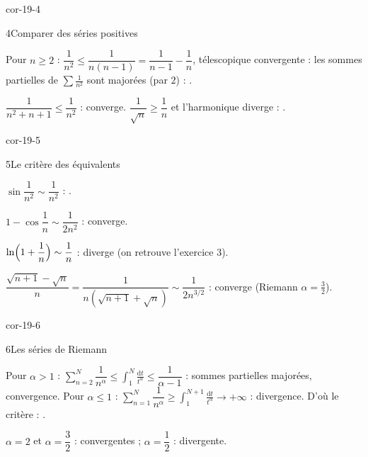 \begin{blocLivre}{cor-19-4}
\begin{corrige}{4}{Comparer des séries positives}
\begin{questions}
  \item Pour $n\geqslant2$ :
    $\dfrac{1}{n^{2}}\leqslant\dfrac{1}{n(n-1)}
    =\dfrac{1}{n-1}-\dfrac1n$, télescopique convergente : les sommes
    partielles de $\sum\frac{1}{n^{2}}$ sont majorées (par $2$) :
    .
  \item $\dfrac{1}{n^{2}+n+1}\leqslant\dfrac{1}{n^{2}}$ : converge.
    $\dfrac{1}{\sqrt n}\geqslant\dfrac1n$ et l'harmonique diverge :
    .
\end{questions}
\end{corrige}
\end{blocLivre}

\begin{blocLivre}{cor-19-5}
\begin{corrige}{5}{Le critère des équivalents}
\begin{questions}
  \item $\sin\dfrac{1}{n^{2}}\sim\dfrac{1}{n^{2}}$ :
    .
  \item $1-\cos\dfrac1n\sim\dfrac{1}{2n^{2}}$ : converge.
  \item $\ln\Bigl(1+\dfrac1n\Bigr)\sim\dfrac1n$ : diverge (on retrouve
    l'exercice 3).
  \item $\dfrac{\sqrt{n+1}-\sqrt n}{n}=\dfrac{1}{n(\sqrt{n+1}+\sqrt n)}
    \sim\dfrac{1}{2n^{3/2}}$ : converge (Riemann $\alpha=\frac32$).
\end{questions}
\end{corrige}
\end{blocLivre}

\begin{blocLivre}{cor-19-6}
\begin{corrige}{6}{Les séries de Riemann}
\begin{questions}
  \item Pour $\alpha>1$ :
    $\sum_{n=2}^{N}\dfrac{1}{n^{\alpha}}
    \leqslant\displaystyle\int_{1}^{N}\frac{\mathrm{d}t}{t^{\alpha}}
    \leqslant\dfrac{1}{\alpha-1}$ : sommes partielles majorées,
    convergence. Pour $\alpha\leqslant1$ :
    $\sum_{n=1}^{N}\dfrac{1}{n^{\alpha}}\geqslant
    \displaystyle\int_{1}^{N+1}\frac{\mathrm{d}t}{t^{\alpha}}
    \to+\infty$ : divergence. D'où le critère :
    .
  \item $\alpha=2$ et $\alpha=\dfrac32$ : convergentes ;
    $\alpha=\dfrac12$ : divergente.
\end{questions}
\end{corrige}
\end{blocLivre}

